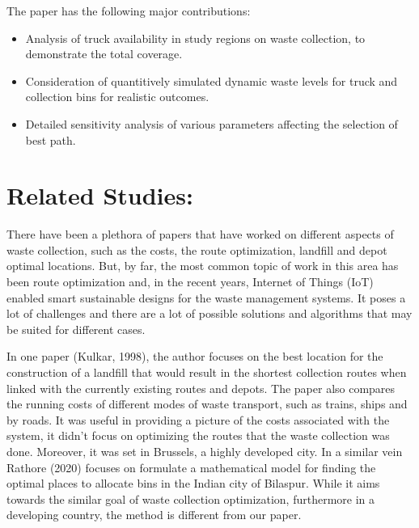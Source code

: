 \documentclass[12pt]{article}
\begin{document}
The paper has the following major contributions:
\begin{itemize}
\item Analysis of truck availability in study regions on waste collection, to demonstrate the total coverage.
\item Consideration of quantitively simulated dynamic waste levels for truck and
collection bins for realistic outcomes.
\item Detailed sensitivity analysis of various parameters affecting the selection of best path.
\end{itemize}

\section{Related Studies:}

There have been a plethora of papers that have worked on different aspects of waste collection, such as the costs, the route optimization, landfill and depot optimal locations. But, by far, the most common topic of work in this area has been route optimization and, in the recent years, Internet of Things (IoT) enabled smart sustainable designs for the waste management systems. It poses a lot of challenges and there are a lot of possible solutions and algorithms that may be suited for different cases. 

In one paper (Kulkar, 1998), the author focuses on the best location for the construction of a landfill that would result in the shortest collection routes when linked with the currently existing routes and depots. The paper also compares the running costs of different modes of waste transport, such as trains, ships and by roads. It was useful in providing a picture of the costs associated with the system, it didn't focus on optimizing the routes that the waste collection was done. Moreover, it was set in Brussels, a highly developed city. In a similar vein Rathore (2020) focuses on formulate a mathematical model for finding the optimal places to allocate bins in the Indian city of Bilaspur. While it aims towards the similar goal of waste collection optimization, furthermore in a developing country, the method is different from our paper.
\end{document}
